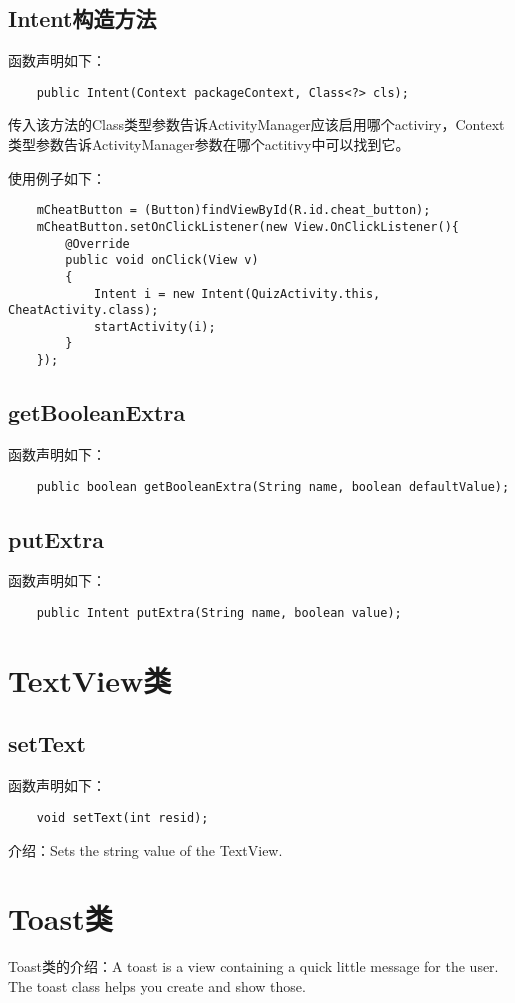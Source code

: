 \documentclass[a4paper,left=2.5cm,right=2.5cm,11pt]{article}
\begin{document}
\subsection{Intent构造方法}
	函数声明如下：
	\begin{lstlisting}
	public Intent(Context packageContext, Class<?> cls);
	\end{lstlisting}

	传入该方法的Class类型参数告诉ActivityManager应该启用哪个activiry，Context类型参数告诉ActivityManager参数在哪个actitivy中可以找到它。\par

	使用例子如下：
	\begin{lstlisting}
	mCheatButton = (Button)findViewById(R.id.cheat_button);
	mCheatButton.setOnClickListener(new View.OnClickListener(){
		@Override
		public void onClick(View v)
		{
			Intent i = new Intent(QuizActivity.this, CheatActivity.class);
			startActivity(i);
		}
	});
	\end{lstlisting}

\subsection{getBooleanExtra}
	函数声明如下：
	\begin{lstlisting}
	public boolean getBooleanExtra(String name, boolean defaultValue);
	\end{lstlisting}

\subsection{putExtra}
	函数声明如下：
	\begin{lstlisting}
	public Intent putExtra(String name, boolean value);
	\end{lstlisting}

\section{TextView类}
\subsection{setText}
	函数声明如下：
	\begin{lstlisting}
	void setText(int resid);
	\end{lstlisting}

	介绍：Sets the string value of the TextView.

\section{Toast类}
	Toast类的介绍：A toast is a view containing a quick little message for the user. The toast class helps you create and show those.
\end{document}

